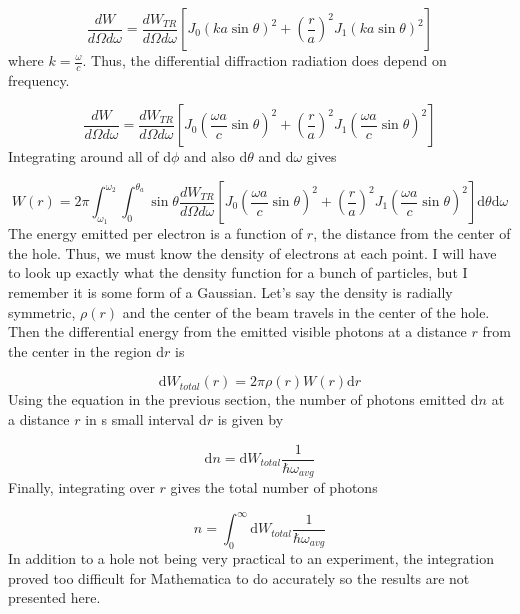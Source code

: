 \documentclass[12pt]{article}
\begin{document}
\begin{equation}
\frac{dW} {d \Omega d \omega}=\frac{dW_{TR}} {d \Omega d \omega} [J_{0}(ka \sin \theta)^{2}+(\frac {r}{a})^{2} J_{1}(ka \sin \theta)^{2}]
\end{equation}
where $k=\frac{\omega}{c}$. Thus, the differential diffraction radiation does depend on frequency.

\begin{equation}
\frac{dW} {d \Omega d \omega}=\frac{dW_{TR}} {d \Omega d \omega} [J_{0}(\frac {\omega a}{c} \sin \theta)^{2}+(\frac {r}{a})^{2} J_{1}(\frac {\omega a}{c} \sin \theta)^{2}]
\end{equation}
Integrating around all of d$\phi$ and also d$\theta$ and d$\omega$ gives

\begin{equation}
W(r)= 2 \pi \int_{\omega_{1}}^{\omega_{2}} \int_{0}^{\theta_{a}} \sin \theta \frac{dW_{TR}} {d \Omega d \omega} [J_{0}(\frac {\omega a}{c} \sin \theta)^{2}+(\frac {r}{a})^{2} J_{1}(\frac {\omega a}{c} \sin \theta)^{2}] \mathrm{d} \theta \mathrm{d} \omega
\end{equation}
The energy emitted per electron is a function of $r$, the distance from the center of the hole. Thus, we must know the density of electrons at each point. I will have to look up exactly what the density function for a bunch of particles, but I remember it is some form of a Gaussian. Let's say the density is radially symmetric, $\rho (r)$ and the center of the beam travels in the center of the hole. Then the differential energy from the emitted visible photons at a distance $r$ from the center in the region d$r$ is

\begin{equation}
\mathrm{d}W_{total}(r)=2 \pi \rho (r) W(r) \mathrm{d}r
\end{equation}
Using the equation in the previous section, the number of photons emitted d$n$ at a distance $r$ in s small interval d$r$ is given by

\begin{equation}
\mathrm{d}n=\mathrm{d} W_{total} \frac{1}{\hbar \omega_{avg}}
\end{equation}
Finally, integrating over $r$ gives the total number of photons

\begin{equation}
n=\int_0^{\infty} \mathrm{d} W_{total} \frac{1}{\hbar \omega_{avg}}
\end{equation}
In addition to a hole not being very practical to an experiment, the integration proved too difficult for Mathematica to do accurately so the results are not presented here.
\end{document}
